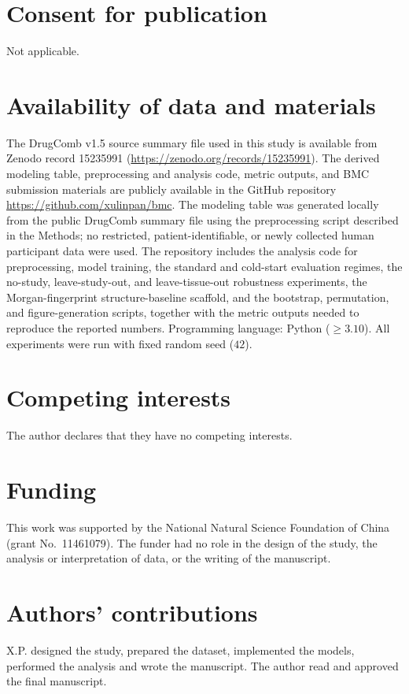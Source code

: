 \documentclass[11pt]{article}
\begin{document}
\section*{Consent for publication}
Not applicable.

\section*{Availability of data and materials}
The DrugComb v1.5 source summary file used in this study is available from Zenodo record 15235991
(\url{https://zenodo.org/records/15235991}). The derived modeling table, preprocessing and
analysis code, metric outputs, and BMC submission materials are publicly available in the GitHub
repository \url{https://github.com/xulinpan/bmc}. The modeling table was generated locally from the
public DrugComb summary file using the preprocessing script described in the Methods; no restricted,
patient-identifiable, or newly collected human participant data were used. The repository includes the
analysis code for preprocessing, model training, the standard and cold-start evaluation regimes, the
no-study, leave-study-out, and leave-tissue-out robustness experiments, the Morgan-fingerprint
structure-baseline scaffold, and the bootstrap, permutation, and figure-generation scripts, together
with the metric outputs needed to reproduce the reported numbers. Programming language: Python
($\geq 3.10$). All experiments were run with fixed random seed ($42$).

\section*{Competing interests}
The author declares that they have no competing interests.

\section*{Funding}
This work was supported by the National Natural Science Foundation of China (grant No.~11461079). The
funder had no role in the design of the study, the analysis or interpretation of data, or the writing
of the manuscript.

\section*{Authors' contributions}
X.P. designed the study, prepared the dataset, implemented the models, performed the analysis and wrote
the manuscript. The author read and approved the final manuscript.
\end{document}
